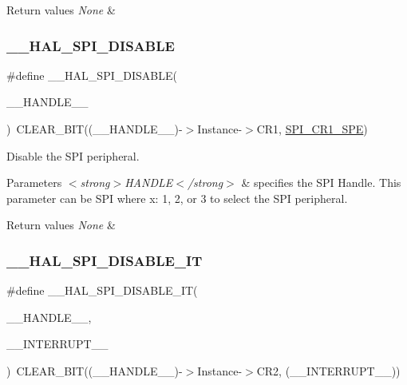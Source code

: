 \begin{DoxyRetVals}{Return values}
{\em None} & \\
\hline
\end{DoxyRetVals}
\mbox{\label{group___s_p_i___exported___macros_gaa10d88f87d16de53bd81dfb33bd56959}} 
\subsubsection{\texorpdfstring{\_\_HAL\_SPI\_DISABLE}{\_\_HAL\_SPI\_DISABLE}}
{\footnotesize\ttfamily \#define \+\_\+\+\_\+\+H\+A\+L\+\_\+\+S\+P\+I\+\_\+\+D\+I\+S\+A\+B\+LE(\begin{DoxyParamCaption}\item[{}]{\+\_\+\+\_\+\+H\+A\+N\+D\+L\+E\+\_\+\+\_\+ }\end{DoxyParamCaption})~C\+L\+E\+A\+R\+\_\+\+B\+IT((\+\_\+\+\_\+\+H\+A\+N\+D\+L\+E\+\_\+\+\_\+)-\/$>$Instance-\/$>$C\+R1, \mbox{\hyperlink{group___peripheral___registers___bits___definition_gac5a646d978d3b98eb7c6a5d95d75c3f9}{S\+P\+I\+\_\+\+C\+R1\+\_\+\+S\+PE}})}



Disable the S\+PI peripheral. 


\begin{DoxyParams}{Parameters}
{\em $<$strong$>$\+H\+A\+N\+D\+L\+E$<$/strong$>$} & specifies the S\+PI Handle. This parameter can be S\+PI where x\+: 1, 2, or 3 to select the S\+PI peripheral. \\
\hline
\end{DoxyParams}

\begin{DoxyRetVals}{Return values}
{\em None} & \\
\hline
\end{DoxyRetVals}
\mbox{\label{group___s_p_i___exported___macros_ga47fa7321c5755bfbff1a7229fbe5b21c}} 
\subsubsection{\texorpdfstring{\_\_HAL\_SPI\_DISABLE\_IT}{\_\_HAL\_SPI\_DISABLE\_IT}}
{\footnotesize\ttfamily \#define \+\_\+\+\_\+\+H\+A\+L\+\_\+\+S\+P\+I\+\_\+\+D\+I\+S\+A\+B\+L\+E\+\_\+\+IT(\begin{DoxyParamCaption}\item[{}]{\+\_\+\+\_\+\+H\+A\+N\+D\+L\+E\+\_\+\+\_\+,  }\item[{}]{\+\_\+\+\_\+\+I\+N\+T\+E\+R\+R\+U\+P\+T\+\_\+\+\_\+ }\end{DoxyParamCaption})~C\+L\+E\+A\+R\+\_\+\+B\+IT((\+\_\+\+\_\+\+H\+A\+N\+D\+L\+E\+\_\+\+\_\+)-\/$>$Instance-\/$>$C\+R2, (\+\_\+\+\_\+\+I\+N\+T\+E\+R\+R\+U\+P\+T\+\_\+\+\_\+))}



